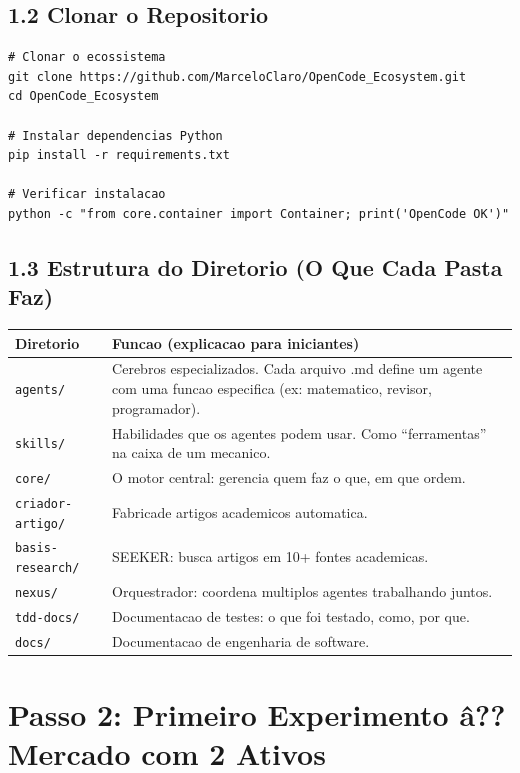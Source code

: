 \subsection{1.2 Clonar o Repositorio}

\begin{lstlisting}[caption={Clonar e configurar}, label=lst:clone]
# Clonar o ecossistema
git clone https://github.com/MarceloClaro/OpenCode_Ecosystem.git
cd OpenCode_Ecosystem

# Instalar dependencias Python
pip install -r requirements.txt

# Verificar instalacao
python -c "from core.container import Container; print('OpenCode OK')"
\end{lstlisting}

\subsection{1.3 Estrutura do Diretorio (O Que Cada Pasta Faz)}

\begin{center}
\begin{tabular}{p{}p{}}
\toprule
\textbf{Diretorio} & \textbf{Funcao (explicacao para iniciantes)} \\
\midrule
\texttt{agents/} & Cerebros especializados. Cada arquivo .md define um agente
com uma funcao especifica (ex: matematico, revisor, programador). \\
\texttt{skills/} & Habilidades que os agentes podem usar. Como ``ferramentas''
na caixa de um mecanico. \\
\texttt{core/} & O motor central: gerencia quem faz o que, em que ordem. \\
\texttt{criador-artigo/} & Fabricade artigos academicos automatica. \\
\texttt{basis-research/} & SEEKER: busca artigos em 10+ fontes academicas. \\
\texttt{nexus/} & Orquestrador: coordena multiplos agentes trabalhando juntos. \\
\texttt{tdd-docs/} & Documentacao de testes: o que foi testado, como, por que. \\
\texttt{docs/} & Documentacao de engenharia de software. \\
\bottomrule
\end{tabular}
\end{center}

\section{Passo 2: Primeiro Experimento \^a?? Mercado com 2 Ativos}

